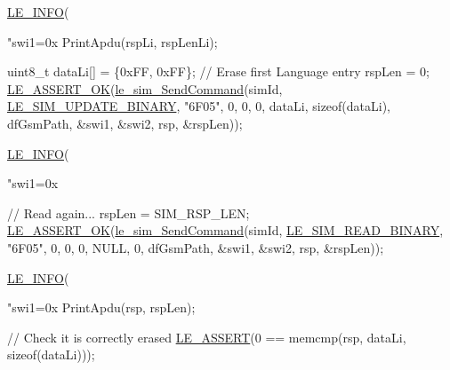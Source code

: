 \begin{DoxyCodeInclude}
{{{    \hyperlink{le__log_8h_a23e6d206faa64f612045d688cdde5808}{LE\_INFO}(\textcolor{stringliteral}{"swi1=0x%
    PrintApdu(rspLi, rspLenLi);

    uint8\_t dataLi[] = \{0xFF, 0xFF\};
    \textcolor{comment}{// Erase first Language entry}
    rspLen = 0;
    \hyperlink{le__log_8h_a7cd2daa3d4af1de4d29e0eed95187484}{LE\_ASSERT\_OK}(\hyperlink{le__sim__interface_8h_a8bbaea044b44f8b0ebff67bf98de816a}{le\_sim\_SendCommand}(simId,
                                    \hyperlink{le__sim__interface_8h_ac1a708ba305c36e33383073ec7f0e331a68f83c3e207642ec4153b67c51cd3cd6}{LE\_SIM\_UPDATE\_BINARY},
                                    \textcolor{stringliteral}{"6F05"},
                                    0,
                                    0,
                                    0,
                                    dataLi,
                                    \textcolor{keyword}{sizeof}(dataLi),
                                    dfGsmPath,
                                    &swi1,
                                    &swi2,
                                    rsp,
                                    &rspLen));

    \hyperlink{le__log_8h_a23e6d206faa64f612045d688cdde5808}{LE\_INFO}(\textcolor{stringliteral}{"swi1=0x%

    \textcolor{comment}{// Read again...}
    rspLen = SIM\_RSP\_LEN;
    \hyperlink{le__log_8h_a7cd2daa3d4af1de4d29e0eed95187484}{LE\_ASSERT\_OK}(\hyperlink{le__sim__interface_8h_a8bbaea044b44f8b0ebff67bf98de816a}{le\_sim\_SendCommand}(simId,
                                    \hyperlink{le__sim__interface_8h_ac1a708ba305c36e33383073ec7f0e331ae4a619ba58f2cd503103b397b717b16f}{LE\_SIM\_READ\_BINARY},
                                    \textcolor{stringliteral}{"6F05"},
                                    0,
                                    0,
                                    0,
                                    NULL,
                                    0,
                                    dfGsmPath,
                                    &swi1,
                                    &swi2,
                                    rsp,
                                    &rspLen));

    \hyperlink{le__log_8h_a23e6d206faa64f612045d688cdde5808}{LE\_INFO}(\textcolor{stringliteral}{"swi1=0x%
    PrintApdu(rsp, rspLen);

    \textcolor{comment}{// Check it is correctly erased}
    \hyperlink{le__log_8h_ac0dbbef91dc0fed449d0092ff0557b39}{LE\_ASSERT}(0 == memcmp(rsp, dataLi, \textcolor{keyword}{sizeof}(dataLi)));

}}}}}}
\end{DoxyCodeInclude}
